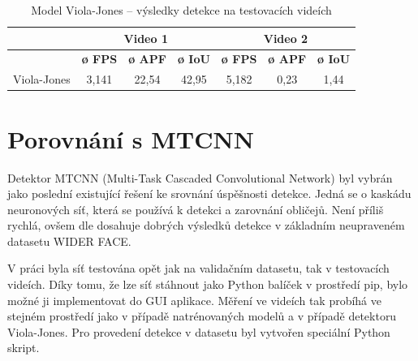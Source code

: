 \begin{table}[H]
  \centering
  \begin{tabular}{c|ccc|ccc|}
  \cline{2-7}
                                                               & \multicolumn{3}{c|}{\cellcolor[HTML]{CBCEFB}\textbf{Video 1}}                                                                              & \multicolumn{3}{c|}{\cellcolor[HTML]{CBCEFB}\textbf{Video 2}}                                                                              \\ \hline
  \rowcolor[HTML]{E0DBDB} 
  \multicolumn{1}{|c|}{\cellcolor[HTML]{E0DBDB}\textbf{Model}} & \multicolumn{1}{c|}{\cellcolor[HTML]{E0DBDB}\textbf{ø FPS}} & \multicolumn{1}{c|}{\cellcolor[HTML]{E0DBDB}\textbf{ø APF}} & \textbf{ø IoU} & \multicolumn{1}{c|}{\cellcolor[HTML]{E0DBDB}\textbf{ø FPS}} & \multicolumn{1}{c|}{\cellcolor[HTML]{E0DBDB}\textbf{ø APF}} & \textbf{ø IoU} \\ \hline
  \multicolumn{1}{|c|}{\cellcolor[HTML]{E0DBDB}Viola-Jones}    & \multicolumn{1}{c|}{3,141}                                  & \multicolumn{1}{c|}{22,54}                                  & 42,95          & \multicolumn{1}{c|}{5,182}                                  & \multicolumn{1}{c|}{0,23}                                   & 1,44           \\ \hline
  \end{tabular}
  \label{tabulka:violajonesvidea}
  \caption{Model Viola-Jones -- výsledky detekce na testovacích videích}
\end{table}

\section{Porovnání s MTCNN}
\label{sekce:mtcnn}
Detektor MTCNN (Multi-Task Cascaded Convolutional Network) \cite{mtcnn, mtcnnpaper} byl vybrán jako poslední existující řešení ke srovnání úspěšnosti detekce. Jedná se o kaskádu neuronových síť, která se používá k detekci a zarovnání obličejů. Není příliš rychlá, ovšem dle \cite{mtcnnpaper} dosahuje dobrých výsledků detekce v základním neupraveném datasetu WIDER FACE.

V práci byla síť testována opět jak na validačním datasetu, tak v testovacích videích. Díky tomu, že lze síť stáhnout jako Python balíček v prostředí pip, bylo možné ji implementovat do GUI aplikace. Měření ve videích tak probíhá ve stejném prostředí jako v případě natrénovaných modelů a v případě detektoru Viola-Jones. Pro provedení detekce v datasetu byl vytvořen speciální Python skript.

